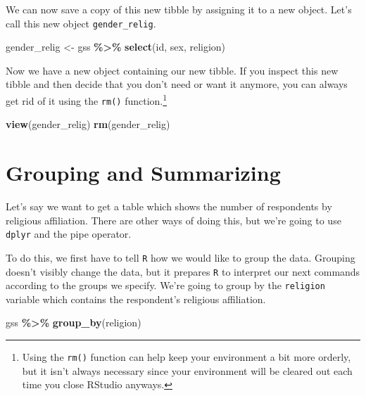 \documentclass[
]{book}
\newenvironment{Shaded}{\begin{snugshade}}{\end{snugshade}}
\newcommand{\FunctionTok}[1]{\textcolor[rgb]{0.13,0.29,0.53}{\textbf{#1}}}
\newcommand{\NormalTok}[1]{#1}
\newcommand{\OtherTok}[1]{\textcolor[rgb]{0.56,0.35,0.01}{#1}}
\newcommand{\SpecialCharTok}[1]{\textcolor[rgb]{0.81,0.36,0.00}{\textbf{#1}}}
\begin{document}
We can now save a copy of this new tibble by assigning it to a new object. Let's call this new object \texttt{gender\_relig}.

\begin{Shaded}
\begin{Highlighting}[]
\NormalTok{gender\_relig }\OtherTok{\textless{}{-}}\NormalTok{ gss }\SpecialCharTok{\%\textgreater{}\%}
  \FunctionTok{select}\NormalTok{(id, sex, religion)}
\end{Highlighting}
\end{Shaded}

Now we have a new object containing our new tibble. If you inspect this new tibble and then decide that you don't need or want it anymore, you can always get rid of it using the \texttt{rm()} function.\footnote{Using the \texttt{rm()} function can help keep your environment a bit more orderly, but it isn't always necessary since your environment will be cleared out each time you close RStudio anyways.}

\begin{Shaded}
\begin{Highlighting}[]
\FunctionTok{view}\NormalTok{(gender\_relig)}
\FunctionTok{rm}\NormalTok{(gender\_relig)}
\end{Highlighting}
\end{Shaded}

\hypertarget{grouping-and-summarizing}{%
\section{Grouping and Summarizing}\label{grouping-and-summarizing}}

Let's say we want to get a table which shows the number of respondents by religious affiliation. There are other ways of doing this, but we're going to use \texttt{dplyr} and the pipe operator.

To do this, we first have to tell \texttt{R} how we would like to group the data. Grouping doesn't visibly change the data, but it prepares \texttt{R} to interpret our next commands according to the groups we specify. We're going to group by the \texttt{religion} variable which contains the respondent's religious affiliation.

\begin{Shaded}
\begin{Highlighting}[]
\NormalTok{gss }\SpecialCharTok{\%\textgreater{}\%}
  \FunctionTok{group\_by}\NormalTok{(religion)}
\end{Highlighting}
\end{Shaded}
\end{document}
